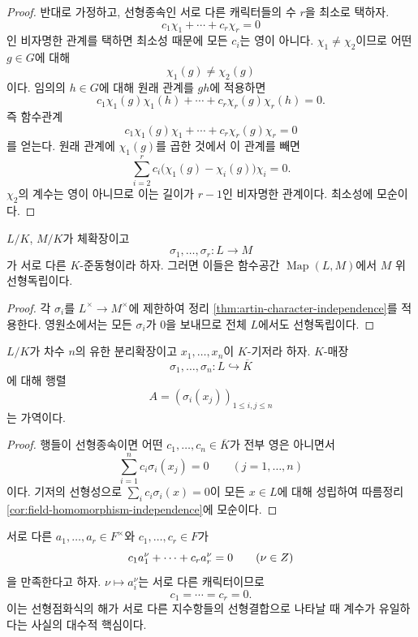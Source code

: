 \begin{proof}
반대로 가정하고, 선형종속인 서로 다른 캐릭터들의 수 $r$을 최소로 택하자.
\[
  c_1\chi_1+\cdots+c_r\chi_r=0
\]
인 비자명한 관계를 택하면 최소성 때문에 모든 $c_i$는 영이 아니다.
$\chi_1\ne\chi_2$이므로 어떤 $g\in G$에 대해
\[
  \chi_1(g)\ne\chi_2(g)
\]
이다. 임의의 $h\in G$에 대해 원래 관계를 $gh$에 적용하면
\[
  c_1\chi_1(g)\chi_1(h)+\cdots+
  c_r\chi_r(g)\chi_r(h)=0.
\]
즉 함수관계
\[
  c_1\chi_1(g)\chi_1+\cdots+
  c_r\chi_r(g)\chi_r=0
\]
를 얻는다. 원래 관계에 $\chi_1(g)$를 곱한 것에서 이 관계를 빼면
\[
  \sum_{i=2}^r
  c_i\bigl(\chi_1(g)-\chi_i(g)\bigr)\chi_i=0.
\]
$\chi_2$의 계수는 영이 아니므로 이는 길이가 $r-1$인 비자명한 관계이다.
최소성에 모순이다.
\end{proof}

\begin{corollary}
\label{cor:field-homomorphism-independence}
$L/K$, $M/K$가 체확장이고
\[
  \sigma_1,\dots,\sigma_r:L\longrightarrow M
\]
가 서로 다른 $K$-준동형이라 하자. 그러면 이들은 함수공간
$\operatorname{Map}(L,M)$에서 $M$ 위 선형독립이다.
\end{corollary}

\begin{proof}
각 $\sigma_i$를 $L^\times\to M^\times$에 제한하여
정리 \ref{thm:artin-character-independence}를 적용한다. 영원소에서는 모든
$\sigma_i$가 $0$을 보내므로 전체 $L$에서도 선형독립이다.
\end{proof}

\begin{corollary}
\label{cor:embedding-matrix-invertible}
$L/K$가 차수 $n$의 유한 분리확장이고
$x_1,\dots,x_n$이 $K$-기저라 하자. $K$-매장
\[
  \sigma_1,\dots,\sigma_n:L\hookrightarrow\overline K
\]
에 대해 행렬
\[
  A=(\sigma_i(x_j))_{1\le i,j\le n}
\]
는 가역이다.
\end{corollary}

\begin{proof}
행들이 선형종속이면 어떤
$c_1,\dots,c_n\in\overline K$가 전부 영은 아니면서
\[
  \sum_{i=1}^n c_i\sigma_i(x_j)=0
  \qquad(j=1,\dots,n)
\]
이다. 기저의 선형성으로
$\sum_i c_i\sigma_i(x)=0$이 모든 $x\in L$에 대해 성립하여
따름정리 \ref{cor:field-homomorphism-independence}에 모순이다.
\end{proof}

\begin{example}[서로 다른 지수함수]
서로 다른 $a_1,\dots,a_r\in F^\times$와
$c_1,\dots,c_r\in F$가
\[
  c_1a_1^\nu+\cdots+c_ra_r^\nu=0
  \qquad(\nu\in Z)
\]
을 만족한다고 하자. $\nu\mapsto a_i^\nu$는 서로 다른 캐릭터이므로
\[
  c_1=\cdots=c_r=0.
\]
이는 선형점화식의 해가 서로 다른 지수항들의 선형결합으로 나타날 때
계수가 유일하다는 사실의 대수적 핵심이다.
\end{example}

